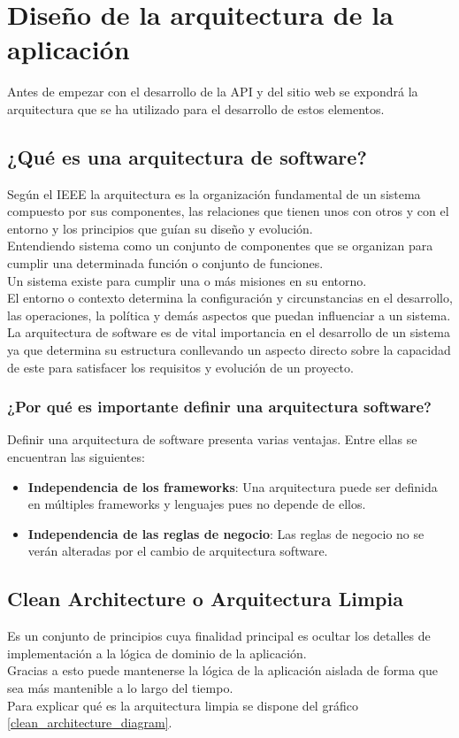 \section{Diseño de la arquitectura de la aplicación}
Antes de empezar con el desarrollo de la API y del sitio web se expondrá la arquitectura que se ha utilizado para el desarrollo de estos elementos.

\subsection{¿Qué es una arquitectura de software?}
Según el IEEE la arquitectura es la organización fundamental de un sistema compuesto por sus componentes, las relaciones que tienen unos con otros y con el entorno y los principios que guían su diseño y evolución.
\\Entendiendo sistema como un conjunto de componentes que se organizan para cumplir una determinada función o conjunto de funciones.
\\Un sistema existe para cumplir una o más misiones en su entorno.
\\El entorno o contexto determina la configuración y circunstancias en el desarrollo, las operaciones, la política y demás aspectos que puedan influenciar a un sistema.
\\La arquitectura de software es de vital importancia en el desarrollo de un sistema ya que determina su estructura conllevando un aspecto directo sobre la capacidad de este para satisfacer los requisitos y evolución de un proyecto.

\subsubsection{¿Por qué es importante definir una arquitectura software?}
Definir una arquitectura de software presenta varias ventajas. Entre ellas se encuentran las siguientes:
\begin{itemize}
    \item \textbf{Independencia de los frameworks}: Una arquitectura puede ser definida en múltiples frameworks y lenguajes pues no depende de ellos.
    \item \textbf{Independencia de las reglas de negocio}: Las reglas de negocio no se verán alteradas por el cambio de arquitectura software.
\end{itemize}


\subsection{Clean Architecture o Arquitectura Limpia}
Es un conjunto de principios cuya finalidad principal es ocultar los detalles de implementación a la lógica de dominio de la aplicación.
\\Gracias a esto puede mantenerse la lógica de la aplicación aislada de forma que sea más mantenible a lo largo del tiempo.
\\Para explicar qué es la arquitectura limpia se dispone del gráfico \ref{clean_architecture_diagram}.

